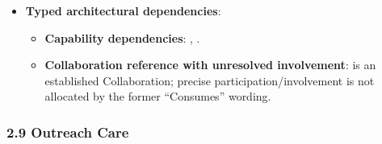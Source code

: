 \begin{itemize}
\begin{itemize}
\begin{itemize}
\item
\emph{Exposed Service}: \texttt{} — Exposes community provider contact rosters.



\end{itemize}


\end{itemize}


\item
\textbf{Typed architectural dependencies}:


\begin{itemize}

\item
\textbf{Capability dependencies}: \texttt{}, \texttt{}.



\item
\textbf{Collaboration reference with unresolved involvement}: \texttt{} is an established Collaboration; precise participation/\allowbreak{}involvement is not allocated by the former “Consumes” wording.



\end{itemize}


\end{itemize}
\label{rad:sd:197}

\par\smallskip
{}\label{rad:sd:199}



\label{rad:sd:201}
\subsubsection*{2.9 Outreach Care}
\label{rad:sd:202}

